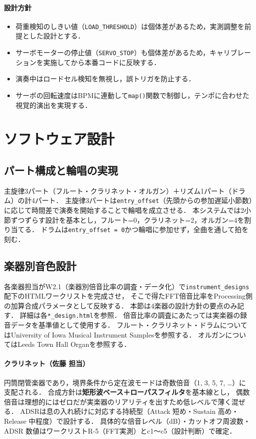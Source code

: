 \documentclass[lualatex,book,paper=a4paper,jafontsize=11.5pt,jafontscale=1.05]{jlreq}
\begin{document}
\paragraph{設計方針}
\begin{itemize}
  \item 荷重検知のしきい値（\texttt{LOAD\_THRESHOLD}）は個体差があるため，実測調整を前提とした設計とする．
  \item サーボモーターの停止値（\texttt{SERVO\_STOP}）も個体差があるため，キャリブレーションを実施してから本番コードに反映する．
  \item 演奏中はロードセル検知を無視し，誤トリガを防止する．
  \item サーボの回転速度はBPMに連動して\texttt{map()}関数で制御し，テンポに合わせた視覚的演出を実現する．
\end{itemize}

\section{ソフトウェア設計}
\subsection{パート構成と輪唱の実現}
主旋律3パート（フルート・クラリネット・オルガン）＋リズム1パート（ドラム）の計4パート．
主旋律3パートは\texttt{entry\_offset}（先頭からの参加遅延小節数）に応じて時間差で演奏を開始することで輪唱を成立させる．
本システムでは2小節ずつずらす設計を基本とし，フルート=0，クラリネット=2，オルガン=4を割り当てる．
ドラムは\texttt{entry\_offset = 0}かつ輪唱に参加せず，全曲を通して拍を刻む．

\subsection{楽器別音色設計}
各楽器担当がW2.1（楽器別倍音比率の調査・データ化）で\texttt{instrument\_designs}配下のHTMLワークリストを完成させ，
そこで得たFFT倍音比率をProcessing側の加算合成パラメータとして反映する．
本節は4楽器の設計方針の要点のみ記す．
詳細は各\texttt{*\_design.html}を参照．
倍音比率の調査にあたっては実楽器の録音データを基準値として使用する．
フルート・クラリネット・ドラムについてはUniversity of Iowa Musical Instrument Samplesを参照する\cite{ref:iowa}．
オルガンについてはLeeds Town Hall Organを参照する\cite{ref:leeds}．

\paragraph{クラリネット（佐藤 担当）}
円筒閉管楽器であり，境界条件から定在波モードは奇数倍音（1, 3, 5, 7, \dots）に支配される．
合成方針は\textbf{矩形波ベース＋ローパスフィルタ}を基本線とし，
偶数倍音は理想的にはゼロだが実楽器のリアリティを出すため低レベルで薄く混ぜる．
ADSRは息の入れ続けに対応する持続型（Attack 短め・Sustain 高め・Release 中程度）で設計する．
具体的な倍音レベル（dB）・カットオフ周波数・ADSR 数値はワークリストR-5（FFT実測）とc1〜c5（設計判断）で確定．
\end{document}
